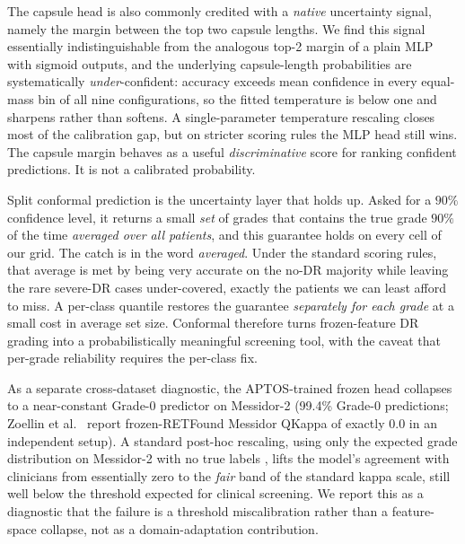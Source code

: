 \documentclass[journal]{IEEEtran}
\begin{document}
The capsule head is also commonly credited with a \emph{native} uncertainty signal, namely the margin between the top two capsule lengths. We find this signal essentially indistinguishable from the analogous top-2 margin of a plain MLP with sigmoid outputs, and the underlying capsule-length probabilities are systematically \emph{under}-confident: accuracy exceeds mean confidence in every equal-mass bin of all nine configurations, so the fitted temperature is below one and sharpens rather than softens. A single-parameter temperature rescaling closes most of the calibration gap, but on stricter scoring rules the MLP head still wins. The capsule margin behaves as a useful \emph{discriminative} score for ranking confident predictions. It is not a calibrated probability.

Split conformal prediction is the uncertainty layer that holds up. Asked for a $90\%$ confidence level, it returns a small \emph{set} of grades that contains the true grade $90\%$ of the time \emph{averaged over all patients}, and this guarantee holds on every cell of our grid. The catch is in the word \emph{averaged}. Under the standard scoring rules, that average is met by being very accurate on the no-DR majority while leaving the rare severe-DR cases under-covered, exactly the patients we can least afford to miss. A per-class quantile restores the guarantee \emph{separately for each grade} at a small cost in average set size. Conformal therefore turns frozen-feature DR grading into a probabilistically meaningful screening tool, with the caveat that per-grade reliability requires the per-class fix.

As a separate cross-dataset diagnostic, the APTOS-trained frozen head collapses to a near-constant Grade-0 predictor on Messidor-2 (99.4\% Grade-0 predictions; Zoellin et al.\ \cite{ref:zoellin} report frozen-RETFound Messidor QKappa of exactly $0.0$ in an independent setup). A standard post-hoc rescaling, using only the expected grade distribution on Messidor-2 with no true labels \cite{ref:saerens,ref:bbse}, lifts the model's agreement with clinicians from essentially zero to the \emph{fair} band of the standard kappa scale, still well below the threshold expected for clinical screening. We report this as a diagnostic that the failure is a threshold miscalibration rather than a feature-space collapse, not as a domain-adaptation contribution.
\end{document}
